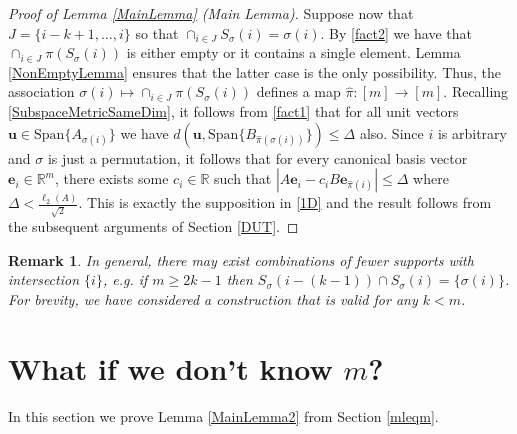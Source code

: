 \documentclass[journal, onecolumn]{IEEEtran}
\newtheorem{remark}{Remark}
\begin{document}
\begin{proof}[Proof of Lemma \ref{MainLemma} (Main Lemma)]
Suppose now that $J = \{i-k+1, \ldots, i\}$ so that $\cap_{i \in J} S_\sigma(i) = \sigma(i)$. By \eqref{fact2} we have that $\cap_{i \in J} \pi(S_\sigma(i))$ is either empty or it contains a single element. Lemma \ref{NonEmptyLemma} ensures that the latter case is the only possibility. Thus, the association $\sigma(i) \mapsto \cap_{i \in J} \pi(S_\sigma(i))$ defines a map $\hat \pi: [m] \to [m]$. Recalling \eqref{SubspaceMetricSameDim}, it follows from \eqref{fact1} that for all unit vectors $\mathbf{u} \in \text{Span}\{A_{\sigma(i)}\}$ we have $d\left( \mathbf{u}, \text{Span}\{B_{\hat \pi(\sigma(i))}\}\right) \leq \Delta$ also. Since $i$ is arbitrary and $\sigma$ is just a permutation, it follows that for every canonical basis vector $\mathbf{e}_i \in \mathbb{R}^m$, there exists some $c_i \in \mathbb{R}$ such that $|A\mathbf{e}_i - c_iB\mathbf{e}_{\hat \pi(i)}| \leq \Delta$ where $\Delta < \frac{\ell_2(A)}{\sqrt{2}}$. This is exactly the supposition in \eqref{1D} and the result follows from the subsequent arguments of Section \ref{DUT}. 
\end{proof}

\begin{remark} In general, there may exist combinations of fewer supports with intersection $\{i\}$, e.g. if $m \geq 2k-1$ then $S_\sigma(i - (k-1)) \cap S_\sigma(i) = \{\sigma(i)\}$. For brevity, we have considered a construction that is valid for any $k < m$.
\end{remark}


\section{What if we don't know $m$?}\label{mleqmAppendix}

In this section we prove Lemma \ref{MainLemma2} from Section \ref{mleqm}.

\end{document}
